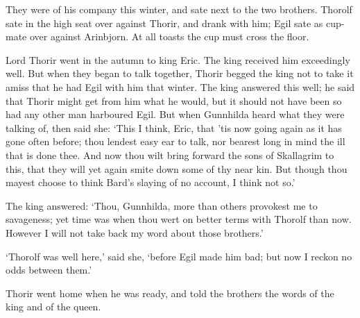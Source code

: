 They were of his company this winter, and sate next to the two brothers. Thorolf sate in the high seat over against Thorir, and drank with him; Egil sate as cup-mate over against Arinbjorn. At all toasts the cup must cross the floor.

Lord Thorir went in the autumn to king Eric. The king received him exceedingly well. But when they began to talk together, Thorir begged the king not to take it amiss that he had Egil with him that winter. The king answered this well; he said that Thorir might get from him what he would, but it should not have been so had any other man harboured Egil. But when Gunnhilda heard what they were talking of, then said she: `This I think, Eric, that 'tis now going again as it has gone often before; thou lendest easy ear to talk, nor bearest long in mind the ill that is done thee. And now thou wilt bring forward the sons of Skallagrim to this, that they will yet again smite down some of thy near kin. But though thou mayest choose to think Bard's slaying of no account, I think not so.'

The king answered: `Thou, Gunnhilda, more than others provokest me to savageness; yet time was when thou wert on better terms with Thorolf than now. However I will not take back my word about those brothers.'

`Thorolf was well here,' said she, `before Egil made him bad; but now I reckon no odds between them.'

Thorir went home when he was ready, and told the brothers the words of the king and of the queen.
